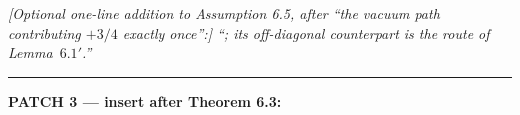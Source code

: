 \documentclass[11pt]{article}
\begin{document}
\noindent\emph{[Optional one-line addition to Assumption 6.5, after ``the
vacuum path contributing $+3/4$ exactly once'':] ``; its off-diagonal
counterpart is the route of Lemma~$6.1'$.''}

\medskip\hrule\medskip
\noindent\textbf{PATCH 3 --- insert after Theorem 6.3:}
\end{document}

